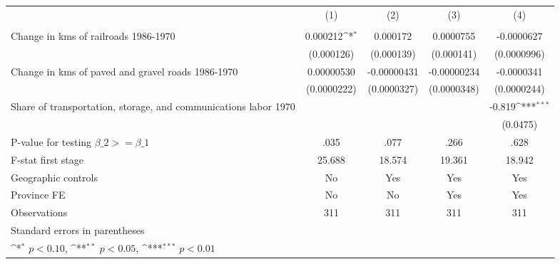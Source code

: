 {
\def\sym#1{\ifmmode^{#1}\else\(^{#1}\)\fi}
\begin{tabular}{l*{4}{c}}
\hline\hline
                &\multicolumn{1}{c}{(1)}&\multicolumn{1}{c}{(2)}&\multicolumn{1}{c}{(3)}&\multicolumn{1}{c}{(4)}\\
                &\multicolumn{1}{c}{}&\multicolumn{1}{c}{}&\multicolumn{1}{c}{}&\multicolumn{1}{c}{}\\
\hline
Change in kms of railroads 1986-1970& 0.000212\sym{*}  & 0.000172         &0.0000755         &-0.0000627         \\
                &(0.000126)         &(0.000139)         &(0.000141)         &(0.0000996)         \\
[1em]
Change in kms of paved and gravel roads 1986-1970&0.00000530         &-0.00000431         &-0.00000234         &-0.0000341         \\
                &(0.0000222)         &(0.0000327)         &(0.0000348)         &(0.0000244)         \\
[1em]
Share of transportation, storage, and communications labor 1970&                  &                  &                  &   -0.819\sym{***}\\
                &                  &                  &                  & (0.0475)         \\
\hline
P-value for testing $\beta\_{2} >= \beta\_{1}$&     .035         &     .077         &     .266         &     .628         \\
F-stat first stage&   25.688         &   18.574         &   19.361         &   18.942         \\
Geographic controls&       No         &      Yes         &      Yes         &      Yes         \\
Province FE     &       No         &       No         &      Yes         &      Yes         \\
Observations    &      311         &      311         &      311         &      311         \\
\hline\hline
\multicolumn{5}{l}{\footnotesize Standard errors in parentheses}\\
\multicolumn{5}{l}{\footnotesize \sym{*} \(p<0.10\), \sym{**} \(p<0.05\), \sym{***} \(p<0.01\)}\\
\end{tabular}
}
